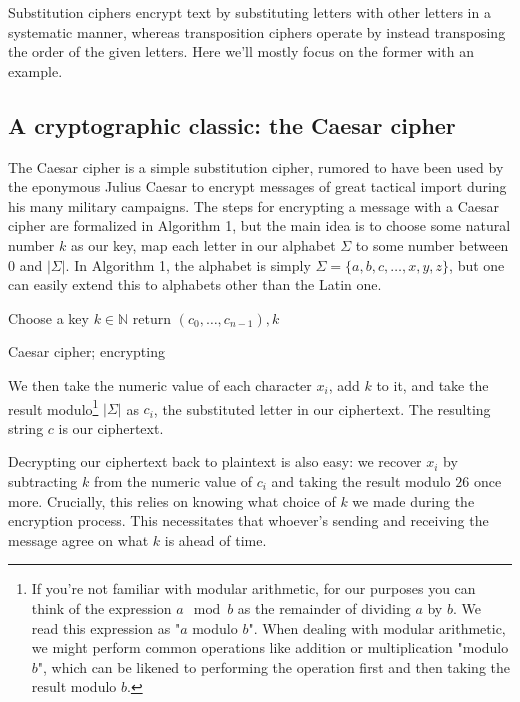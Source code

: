 \documentclass{paper}
\begin{document}
\medskip Substitution ciphers encrypt text by substituting letters with other letters in a systematic manner, whereas transposition ciphers operate by instead transposing the order of the given letters. Here we'll mostly focus on the former with an example.

\subsection{A cryptographic classic: the Caesar cipher}

The Caesar cipher is a simple substitution cipher, rumored to have been used by the eponymous Julius Caesar to encrypt messages of great tactical import during his many military campaigns. The steps for encrypting a message with a Caesar cipher are formalized in Algorithm 1, but the main idea is to choose some natural number $k$ as our key, map each letter in our alphabet $\Sigma$ to some number between $0$ and $|\Sigma|$. In Algorithm 1, the alphabet is simply $\Sigma = \{ a, b, c, \dots, x, y, z \}$, but one can easily extend this to alphabets other than the Latin one.

\begin{algorithm}
    \SetAlgoLined
    Choose a key $k \in \mathbb{N}$\;
    return $(c_0, \dots, c_{n-1}), k$\;
    \caption{Caesar cipher; encrypting}
\end{algorithm}

\medskip
We then take the numeric value of each character $x_i$, add $k$ to it, and take the result modulo\footnote{If you're not familiar with modular arithmetic, for our purposes you can think of the expression $a \mod b$ as the remainder of dividing $a$ by $b$. We read this expression as "$a$ modulo $b$". When dealing with modular arithmetic, we might perform common operations like addition or multiplication "modulo $b$", which can be likened to performing the operation first and then taking the result modulo $b$.} $|\Sigma|$ as $c_i$, the substituted letter in our ciphertext. The resulting string $c$ is our ciphertext. 

\medskip
Decrypting our ciphertext back to plaintext is also easy: we recover $x_i$ by subtracting $k$ from the numeric value of $c_i$ and taking the result modulo $26$ once more. Crucially, this relies on knowing what choice of $k$ we made during the encryption process. This necessitates that whoever's sending and receiving the message agree on what $k$ is ahead of time. 
\end{document}
